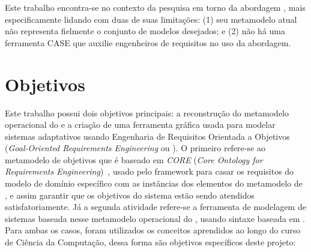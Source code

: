 
Este trabalho encontra-se no contexto da pesquisa em torno da abordagem \zanshin, mais especificamente lidando com duas de suas limitações: (1) seu metamodelo atual não representa fielmente o conjunto de modelos desejados; e (2) não há uma ferramenta CASE que auxilie engenheiros de requisitos no uso da abordagem.



\section{Objetivos}
\label{sec-intro-objetivos}

Este trabalho possui dois objetivos principais: a reconstrução do metamodelo operacional do \zanshin e a criação de uma ferramenta gráfica usada para modelar sistemas adaptativos usando Engenharia de Requisitos Orientada a Objetivos (\textit{Goal-Oriented Requirements Engineering} ou \gore). O primeiro refere-se ao metamodelo de objetivos que é baseado em \textit{CORE} (\textit{Core Ontology for Requirements Engineering})~\cite{jureta2007core}, usado pelo framework para casar os requisitos do modelo de domínio específico com as instâncias dos elementos do metamodelo de \gore, e assim garantir que os objetivos do sistema estão sendo atendidos satisfatoriamente. Já a segunda atividade refere-se a ferramenta de modelagem de sistemas baseada nesse metamodelo operacional do \zanshin, usando sintaxe baseada em \istar. Para ambas os casos, foram utilizados os conceitos aprendidos ao longo do curso de Ciência da Computação, dessa forma são objetivos específicos deste projeto:


